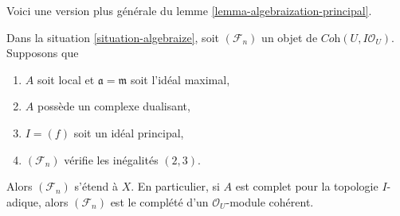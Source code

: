 \noindent
Voici une version plus générale du lemme \ref{lemma-algebraization-principal}.

\begin{lemma}
\label{lemma-algebraization-principal-bis}
Dans la situation \ref{situation-algebraize}, soit $(\mathcal{F}_n)$ un objet
de $\textit{Coh}(U, I\mathcal{O}_U)$. Supposons que
\begin{enumerate}
\item $A$ soit local et $\mathfrak a = \mathfrak m$ soit l'idéal maximal,
\item $A$ possède un complexe dualisant,
\item $I = (f)$ soit un idéal principal,
\item $(\mathcal{F}_n)$ vérifie les inégalités $(2, 3)$.
\end{enumerate}
Alors $(\mathcal{F}_n)$ s'étend à $X$. En particulier, si $A$ est
complet pour la topologie $I$-adique, alors $(\mathcal{F}_n)$ est le complété
d'un $\mathcal{O}_U$-module cohérent. 
\end{lemma}

